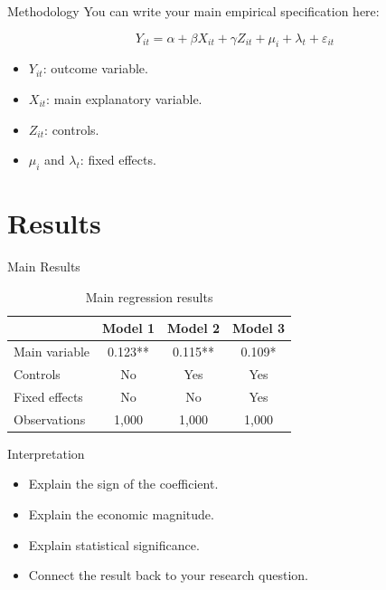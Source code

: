 \documentclass[aspectratio=169]{beamer}
\begin{document}
\begin{frame}{Methodology}
  You can write your main empirical specification here:

  \[
    Y_{it} = \alpha + \beta X_{it} + \gamma Z_{it} + \mu_i + \lambda_t + \varepsilon_{it}
  \]

  \begin{itemize}
    \item $Y_{it}$: outcome variable.
    \item $X_{it}$: main explanatory variable.
    \item $Z_{it}$: controls.
    \item $\mu_i$ and $\lambda_t$: fixed effects.
  \end{itemize}
\end{frame}

\section{Results}

\begin{frame}{Main Results}
  \begin{table}
    \centering
    \begin{tabular}{lccc}
      \toprule
      & Model 1 & Model 2 & Model 3 \\
      \midrule
      Main variable & 0.123** & 0.115** & 0.109* \\
      Controls      & No      & Yes     & Yes    \\
      Fixed effects & No      & No      & Yes    \\
      \midrule
      Observations  & 1,000   & 1,000   & 1,000  \\
      \bottomrule
    \end{tabular}
    \caption{Main regression results}
  \end{table}

\end{frame}

\begin{frame}{Interpretation}
  \begin{itemize}
    \item Explain the sign of the coefficient.
    \item Explain the economic magnitude.
    \item Explain statistical significance.
    \item Connect the result back to your research question.
  \end{itemize}
\end{frame}
\end{document}
